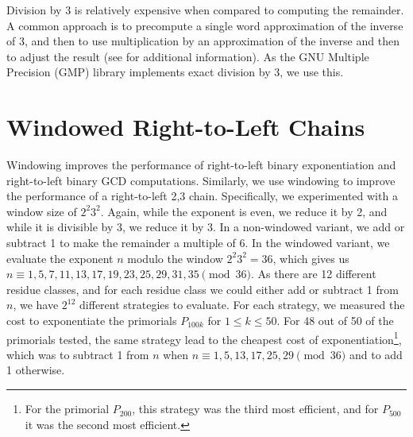 \documentclass{ucalgthes1}
\theoremstyle{definition}
\begin{document}
Division by 3 is relatively expensive when compared to computing the remainder.  A common approach is to precompute a single word approximation of the inverse of 3, and then to use multiplication by an approximation of the inverse and then to adjust the result (see \cite{Granlund1994,Warren2002,Moller2011} for additional information).  As the GNU Multiple Precision (GMP) library implements exact division by 3, we use this.


\section{Windowed Right-to-Left Chains}

Windowing improves the performance of right-to-left binary exponentiation and right-to-left binary GCD computations.  Similarly, we use windowing to improve the performance of a right-to-left 2,3 chain.  Specifically, we experimented with a window size of $2^2 3^2$.  Again, while the exponent is even, we reduce it by 2, and while it is divisible by 3, we reduce it by 3.  In a non-windowed variant, we add or subtract 1 to make the remainder a multiple of 6.  In the windowed variant, we evaluate the exponent $n$ modulo the window $2^2 3^2 = 36$, which gives us $n \equiv 1, 5, 7, 11, 13, 17, 19, 23, 25, 29, 31, 35 \pmod {36}$.  As there are 12 different residue classes, and for each residue class we could either add or subtract 1 from $n$, we have $2^{12}$ different strategies to evaluate.  For each strategy, we measured the cost to exponentiate the primorials $P_{100k}$ for $1 \le k \le 50$. For 48 out of 50 of the primorials tested, the same strategy lead to the cheapest cost of exponentiation\footnote{For the primorial $P_{200}$, this strategy was the third most efficient, and for $P_{500}$ it was the second most efficient.}, which was to subtract 1 from $n$ when $n \equiv 1, 5, 13, 17, 25, 29 \pmod{36}$ and to add 1 otherwise.
\end{document}
